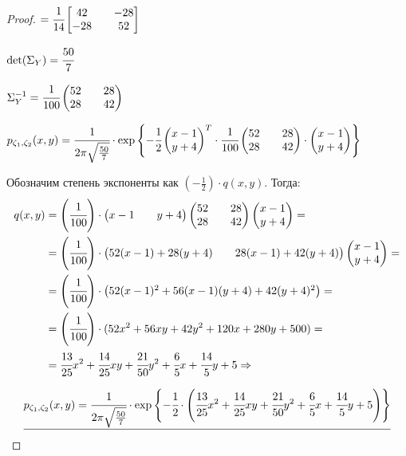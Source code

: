 \begin{proof}
	$ =\cfrac1{14}\begin{bmatrix} 42 && -28 \\ -28 && 52 \end{bmatrix} $
	
	$ \det(\Sigma_Y)=\cfrac{50}{7} $
	
	$ \Sigma_Y^{-1}=\cfrac1{100}\begin{pmatrix} 52 && 28 \\ 28 && 42 \end{pmatrix}$
	
	$ p_{\zeta_1,\zeta_2}(x, y) = \cfrac1{2\pi\sqrt{\frac{50}{7}}} \cdot \exp \left\{-\cfrac12\begin{pmatrix} x-1 \\ y+4 \end{pmatrix}^T\cdot\cfrac1{100}\begin{pmatrix} 52 && 28 \\ 28 && 42 \end{pmatrix}\cdot\begin{pmatrix} x-1 \\ y+4 \end{pmatrix}\right\} $
	
	Обозначим степень экспоненты как $\left(-\frac12\right)\cdot q(x, y)$. Тогда:
	\begin{align}
	q(x, y)& =\left(\cfrac1{100}\right)\cdot\begin{pmatrix} x-1 && y+4 \end{pmatrix}\begin{pmatrix} 52 && 28 \\ 28 && 42 \end{pmatrix}\begin{pmatrix} x-1 \\ y+4 \end{pmatrix}= \\	
	& =\left(\cfrac1{100}\right)\cdot\begin{pmatrix} 52(x-1)+28(y+4) && 28(x-1)+42(y+4) \end{pmatrix}\begin{pmatrix} x-1 \\ y+4 \end{pmatrix}= \\	
	& =\left(\cfrac1{100}\right)\cdot\begin{pmatrix} 52(x-1)^2+56(x-1)(y+4)+42(y+4)^2\end{pmatrix}= \\	
	& =\left(\cfrac1{100}\right)\cdot(52x^2+56xy+42y^2+120x+280y+500)= \\	
	& =\cfrac{13}{25}x^2+\cfrac{14}{25}xy+\cfrac{21}{50}y^2+\cfrac65x+\cfrac{14}5y+5 \Rightarrow
	\end{align}
	
	\begin{equation}
		\underline{  
		p_{\zeta_1,\zeta_2}(x, y) = \cfrac1{2\pi\sqrt{\frac{50}{7}}} \cdot \exp \left\{-\cfrac12\cdot\left(\cfrac{13}{25}x^2+\cfrac{14}{25}xy+\cfrac{21}{50}y^2+\cfrac65x+\cfrac{14}5y+5\right)\right\}}
	\end{equation}  
\end{proof}

